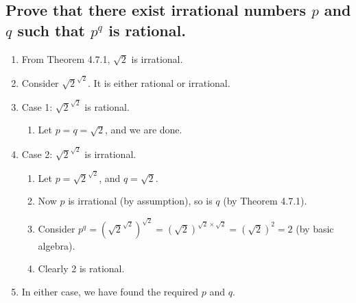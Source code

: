 \documentclass{article}
\begin{document}
\subsection*{Prove that there exist irrational numbers $p$ and $q$ such that $p^q$ is rational.}
\begin{enumerate}
    \item From Theorem 4.7.1, $\sqrt{2}$ is irrational. 
    \item Consider $\sqrt{2}^{\sqrt{2}}$. It is either rational or irrational. 
    \item Case 1: $\sqrt{2}^{\sqrt{2}}$ is rational.
    \begin{enumerate}
        \item Let $p=q=\sqrt{2}$, and we are done. 
    \end{enumerate}
    \item Case 2: $\sqrt{2}^{\sqrt{2}}$ is irrational.
    \begin{enumerate}
        \item Let $p=\sqrt{2}^{\sqrt{2}}$, and $q={\sqrt{2}}$.
        \item Now $p$ is irrational (by assumption), so is $q$ (by Theorem 4.7.1).
        \item Consider $p^q=(\sqrt{2}^{\sqrt{2}})^{\sqrt{2}}=(\sqrt{2})^{\sqrt{2}\times\sqrt{2}}=(\sqrt{2})^2=2$ (by basic algebra).
        \item Clearly 2 is rational. 
    \end{enumerate}
    \item In either case, we have found the required $p$ and $q$. 
\end{enumerate}

\vspace{0.1cm}

\endgroup


\end{document}
